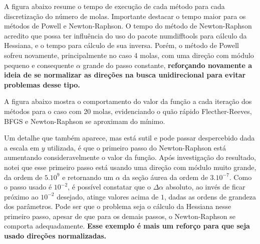 \documentclass[10pt, a4paper]{article}
\begin{document}
A figura abaixo resume o tempo de execução de cada método para cada discretização do número de molas.
Importante destacar o tempo maior para os métodos de Powell e Newton-Raphson. O tempo do método de Newton-Raphson 
acredito que possa ter influência do uso do pacote numdifftools para cálculo da Hessiana, e o tempo para cálculo de sua inversa.
Porém, o método de Powell sofreu novamente, principalmente no caso 4 molas, com uma direção com módulo pequeno e
consequente $\alpha$ grande do passo constante, \textbf{reforçando novamente a ideia de se normalizar as direções na busca unidirecional
 para evitar problemas desse tipo.}


A figura abaixo mostra o comportamento do valor da função a cada iteração dos métodos para o caso
com 20 molas, evidenciando o quão rápido Flecther-Reeves,
BFGS e Newton-Raphson se aproximam do mínimo.  

Um detalhe que também aparece, mas está sutil e pode passar despercebido dada a escala em $y$ utilizada,
é que o primeiro passo do Newton-Raphson está aumentando consideravelmente o valor da função. Após investigação do resultado,
notei que esse primeiro passo está usando uma direção com módulo muito grande, da ordem de $5.10^9$ e retornando um 
$\alpha$ da seção áurea da ordem de $3.10^{-7}$. Como o passo usado é $10^{-2}$, é possível constatar que o $\Delta \alpha$
absoluto, ao invés de ficar próximo ao ${10^{-2}}$ desejado, atinge valores acima de $1$, dadas as ordens de grandeza dos
parâmetros. Pode ser que o problema seja o cálculo da Hessiana nesse primeiro passo, apesar de que para os demais passos,
o Newton-Raphson se comporta adequadamente. \textbf{Esse exemplo é mais um reforço para que seja usado direções normalizadas.}


\end{document}
